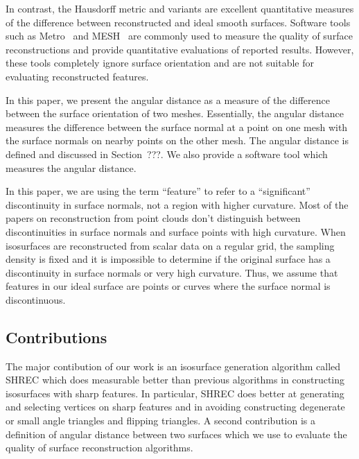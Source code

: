 In contrast, the Hausdorff metric and variants are excellent
quantitative measures of the difference between reconstructed
and ideal smooth surfaces.
Software tools such as Metro~\cite{Cignoni:1998:metro} 
and MESH~\cite{Aspert:2002:MESH} are commonly used to measure
the quality of surface reconstructions
and provide quantitative evaluations of reported results.
However, these tools completely ignore surface orientation
and are not suitable for evaluating reconstructed features.

In this paper, we present the angular distance as a measure
of the difference between the surface orientation of two meshes.
Essentially, the angular distance measures the difference 
between the surface normal at a point on one mesh with the surface normals
on nearby points on the other mesh.
The angular distance is defined and discussed in Section~???.
We also provide a software tool which measures the angular distance.

In this paper, we are using the term ``feature'' to refer 
to a ``significant'' discontinuity in surface normals,
not a region with higher curvature.
Most of the papers on reconstruction from point clouds
don't distinguish between discontinuities in surface normals
and surface points with high curvature.
When isosurfaces are reconstructed from scalar data on a regular grid,
the sampling density is fixed and
it is impossible to determine if the original surface has
a discontinuity in surface normals or very high curvature.
Thus, we assume that features in our ideal surface are
points or curves where the surface normal is discontinuous.


\subsection*{Contributions}

The major contibution of our work is an isosurface generation algorithm
called SHREC which does measurable better than previous algorithms
in constructing isosurfaces with sharp features.
In particular, SHREC does better at generating and selecting vertices 
on sharp features and in avoiding constructing degenerate 
or small angle triangles and flipping triangles.
A second contribution is a definition of angular distance 
between two surfaces which we use to evaluate the quality 
of surface reconstruction algorithms.
